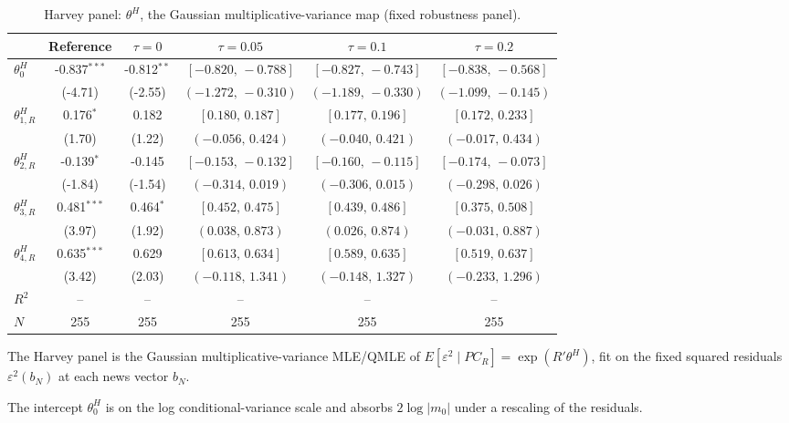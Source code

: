 \begin{table}[!htbp]
\centering
\begin{threeparttable}
\caption{Harvey panel: $\theta^{H}$, the Gaussian multiplicative-variance map (fixed robustness panel).}
\label{tab:log_var_eq_panel_harvey}
\footnotesize\setlength{\tabcolsep}{3pt}
\begin{tabular}{lccccc}
\toprule
 & Reference & $\tau{=}0$ & $\tau{=}0.05$ & $\tau{=}0.1$ & $\tau{=}0.2$ \\
\midrule
$\theta^{H}_0$ & -0.837$^{***}$ & -0.812$^{**}$ & $[-0.820,\,-0.788]$ & $[-0.827,\,-0.743]$ & $[-0.838,\,-0.568]$ \\
 & (-4.71) & (-2.55) & $(-1.272,\,-0.310)$ & $(-1.189,\,-0.330)$ & $(-1.099,\,-0.145)$ \\
\midrule
$\theta^{H}_{1,R}$ & 0.176$^{*}$ & 0.182 & $[0.180,\,0.187]$ & $[0.177,\,0.196]$ & $[0.172,\,0.233]$ \\
 & (1.70) & (1.22) & $(-0.056,\,0.424)$ & $(-0.040,\,0.421)$ & $(-0.017,\,0.434)$ \\
$\theta^{H}_{2,R}$ & -0.139$^{*}$ & -0.145 & $[-0.153,\,-0.132]$ & $[-0.160,\,-0.115]$ & $[-0.174,\,-0.073]$ \\
 & (-1.84) & (-1.54) & $(-0.314,\,0.019)$ & $(-0.306,\,0.015)$ & $(-0.298,\,0.026)$ \\
$\theta^{H}_{3,R}$ & 0.481$^{***}$ & 0.464$^{*}$ & $[0.452,\,0.475]$ & $[0.439,\,0.486]$ & $[0.375,\,0.508]$ \\
 & (3.97) & (1.92) & $(0.038,\,0.873)$ & $(0.026,\,0.874)$ & $(-0.031,\,0.887)$ \\
$\theta^{H}_{4,R}$ & 0.635$^{***}$ & 0.629 & $[0.613,\,0.634]$ & $[0.589,\,0.635]$ & $[0.519,\,0.637]$ \\
 & (3.42) & (2.03) & $(-0.118,\,1.341)$ & $(-0.148,\,1.327)$ & $(-0.233,\,1.296)$ \\
$R^2$ & -- & -- & -- & -- & -- \\
$N$ & 255 & 255 & 255 & 255 & 255 \\
\bottomrule
\end{tabular}
\begin{tablenotes}[flushleft]
\scriptsize
\item The Harvey panel is the Gaussian multiplicative-variance MLE/QMLE of $E[\varepsilon^2 \mid PC_R] = \exp(R'\theta^{H})$, fit on the fixed squared residuals $\varepsilon^2(b_N)$ at each news vector $b_N$.
\item The intercept $\theta^{H}_0$ is on the log conditional-variance scale and absorbs $2\log|m_0|$ under a rescaling of the residuals.

\end{tablenotes}
\end{threeparttable}
\end{table}

